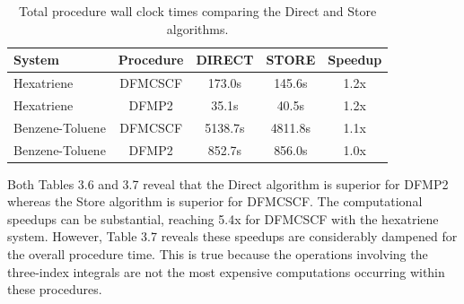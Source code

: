 \begingroup
\begin{table}[H]
\centering
\renewcommand{\baselinestretch}{1}
\caption{Total procedure wall clock times comparing the Direct and Store algorithms.}
\begin{tabular}{l cccc}
\multicolumn{1}{l}{\textbf{System}} &
\multicolumn{1}{c}{\textbf{Procedure}} &
\multicolumn{1}{c}{\textbf{DIRECT}} &
\multicolumn{1}{c}{\textbf{STORE}} &
\multicolumn{1}{c}{\textbf{Speedup}} \\ 
\hline
Hexatriene        & DFMCSCF & 173.0s   & 145.6s  &  1.2x  \\ 
Hexatriene        & DFMP2   & 35.1s    &  40.5s  &  1.2x  \\ 
Benzene-Toluene   & DFMCSCF & 5138.7s  & 4811.8s &  1.1x  \\ 
Benzene-Toluene   & DFMP2   & 852.7s   & 856.0s  &  1.0x  \\ 
\end{tabular}
\end{table}
\endgroup

Both Tables 3.6 and 3.7 reveal that the Direct algorithm is superior for DFMP2 whereas the Store algorithm is superior for
DFMCSCF. The computational speedups can be substantial, reaching 5.4x for DFMCSCF with the hexatriene system. However, Table 3.7
reveals these speedups are considerably dampened for the overall procedure time. This is true because 
the operations involving the three-index integrals are not the most expensive computations occurring within these procedures.



